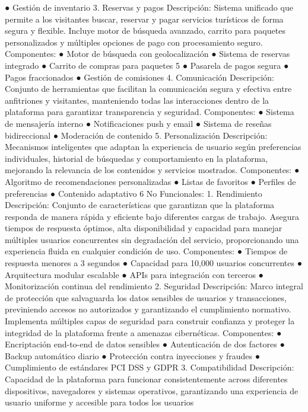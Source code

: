 ● Gestión de inventario
3. Reservas y pagos
Descripción: Sistema unificado que permite a los visitantes buscar, reservar y
pagar servicios turísticos de forma segura y flexible. Incluye motor de búsqueda
avanzado, carrito para paquetes personalizados y múltiples opciones de pago con
procesamiento seguro.
Componentes:
● Motor de búsqueda con geolocalización
● Sistema de reservas integrado
● Carrito de compras para paquetes
5
● Pasarela de pagos segura
● Pagos fraccionados
● Gestión de comisiones
4. Comunicación
Descripción: Conjunto de herramientas que facilitan la comunicación segura y
efectiva entre anfitriones y visitantes, manteniendo todas las interacciones dentro
de la plataforma para garantizar transparencia y seguridad.
Componentes:
● Sistema de mensajería interno
● Notificaciones push y email
● Sistema de reseñas bidireccional
● Moderación de contenido
5. Personalización
Descripción: Mecanismos inteligentes que adaptan la experiencia de usuario
según preferencias individuales, historial de búsquedas y comportamiento en la
plataforma, mejorando la relevancia de los contenidos y servicios mostrados.
Componentes:
● Algoritmo de recomendaciones personalizadas
● Listas de favoritos
● Perfiles de preferencias
● Contenido adaptativo
6
No Funcionales:
1. Rendimiento
Descripción: Conjunto de características que garantizan que la plataforma
responda de manera rápida y eficiente bajo diferentes cargas de trabajo. Asegura
tiempos de respuesta óptimos, alta disponibilidad y capacidad para manejar
múltiples usuarios concurrentes sin degradación del servicio, proporcionando una
experiencia fluida en cualquier condición de uso.
Componentes:
● Tiempos de respuesta menores a 3 segundos
● Capacidad para 10,000 usuarios concurrentes
● Arquitectura modular escalable
● APIs para integración con terceros
● Monitorización continua del rendimiento
2. Seguridad
Descripción: Marco integral de protección que salvaguarda los datos sensibles de
usuarios y transacciones, previniendo accesos no autorizados y garantizando el
cumplimiento normativo. Implementa múltiples capas de seguridad para construir
confianza y proteger la integridad de la plataforma frente a amenazas cibernéticas.
Componentes:
● Encriptación end-to-end de datos sensibles
● Autenticación de dos factores
● Backup automático diario
● Protección contra inyecciones y fraudes
● Cumplimiento de estándares PCI DSS y GDPR
3. Compatibilidad
Descripción: Capacidad de la plataforma para funcionar consistentemente across
diferentes dispositivos, navegadores y sistemas operativos, garantizando una
experiencia de usuario uniforme y accesible para todos los usuarios
